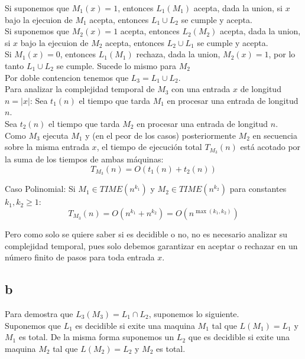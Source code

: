 Si suponemos que $M_1(x)=1$, entonces $L_1(M_1)$ acepta, dada la union, si $x$ bajo la ejecuion de $M_1$ acepta, entonces $L_1 \cup L_2$ se cumple y acepta.\\

Si suponemos que $M_2(x)=1$ acepta, entonces $L_2(M_2)$ acepta, dada la union, si $x$ bajo la ejecuion de $M_2$ acepta, entonces $L_2 \cup L_1$ se cumple y acepta.\\

Si $M_1(x) = 0$, entonces $L_1(M_1)$ rechaza, dada la union, $M_2(x)=1$, por lo tanto $L_1 \cup L_2$ se cumple. Sucede lo mismo para $M_2$\\

Por doble contencion tenemos que $L_3 = L_1 \cup L_2$.\\

Para analizar la complejidad temporal de $M_3$ con una entrada $x$ de longitud $n = \vert{}x\vert{}$:
Sea $t_1(n)$ el tiempo que tarda $M_1$ en procesar una entrada de longitud $n$.\\
Sea $t_2(n)$ el tiempo que tarda $M_2$ en procesar una entrada de longitud $n$.\\

Como $M_3$ ejecuta $M_1$ y (en el peor de los casos) posteriormente $M_2$ en secuencia sobre la misma entrada $x$, el tiempo de ejecución total $T_{M_3}(n)$ está acotado por la suma de los tiempos de ambas máquinas:
$$T_{M_3}(n) = O(t_1(n) + t_2(n))$$

Caso Polinomial:
Si $M_1 \in TIME(n^{k_1})$ y $M_2 \in TIME(n^{k_2})$ para constantes $k_1, k_2 \ge 1$:$$T_{M_3}(n) = O(n^{k_1} + n^{k_2}) = O(n^{\max(k_1, k_2)})$$

Pero como solo se quiere saber si es decidible o no, no es necesario analizar su complejidad temporal, pues solo debemos garantizar en aceptar o rechazar en un número finito de pasos para toda entrada $x$.

\subsection*{b}

Para demostra que $L_3(M_3)=L_1 \cap L_2$, suponemos lo siguiente.\\

Suponemos que $L_1$ es decidible si exite una maquina $M_1$ tal que $L(M_1) = L_1$ y $M_1$ es total. De la misma forma suponemos un $L_2$ que es decidible si exite una maquina $M_2$ tal que $L(M_2) = L_2$ y $M_2$ es total.\\

